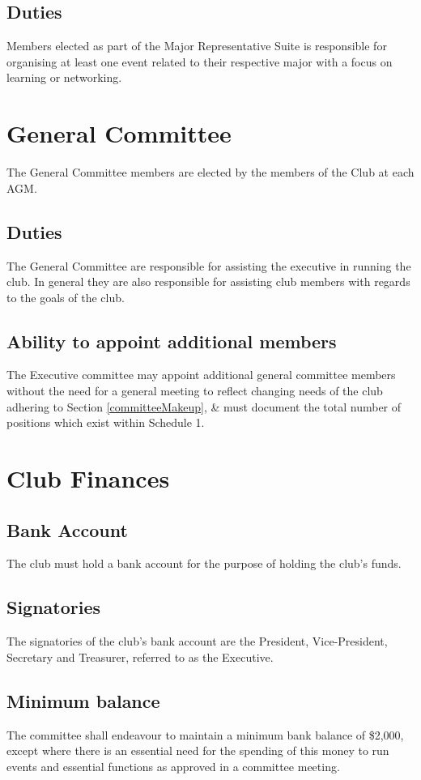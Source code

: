 \documentclass[11pt]{article}
\begin{document}
\subsection{Duties}
Members elected as part of the Major Representative Suite is responsible for organising at least one event related to their respective major with a focus on learning or networking.

\section{General Committee}
The General Committee members are elected by the members of the Club at each AGM.
\subsection{Duties}
The General Committee are responsible for assisting the executive in running the club. In general they are also responsible for assisting club members with regards to the goals of the club.
\subsection{Ability to appoint additional members}
The Executive committee may appoint additional general committee members without the need for a general meeting to reflect changing needs of the club adhering to Section \ref{committeeMakeup}, \& must document the total number of positions which exist within Schedule 1.

\section{Club Finances}
\subsection{Bank Account}
The club must hold a bank account for the purpose of holding the club’s funds.
\subsection{Signatories}
The signatories of the club’s bank account are the President, Vice-President, Secretary and Treasurer, referred to as the Executive.
\subsection{Minimum balance}
The committee shall endeavour to maintain a minimum bank balance of \$2,000, except where there is an essential need for the spending of this money to run events and essential functions as approved in a committee meeting.
\end{document}

